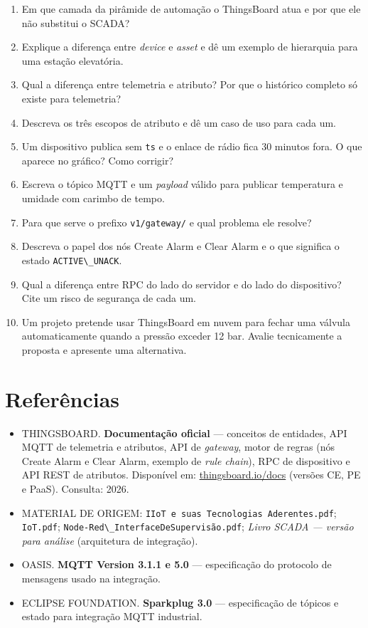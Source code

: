 \begin{enumerate}
\def\labelenumi{\arabic{enumi}.}
\tightlist
\item
  Em que camada da pirâmide de automação o ThingsBoard atua e por que ele não substitui o SCADA?
\item
  Explique a diferença entre \emph{device} e \emph{asset} e dê um exemplo de hierarquia para uma estação elevatória.
\item
  Qual a diferença entre telemetria e atributo? Por que o histórico completo só existe para telemetria?
\item
  Descreva os três escopos de atributo e dê um caso de uso para cada um.
\item
  Um dispositivo publica sem \passthrough{\lstinline!ts!} e o enlace de rádio fica 30 minutos fora. O que aparece no gráfico? Como corrigir?
\item
  Escreva o tópico MQTT e um \emph{payload} válido para publicar temperatura e umidade com carimbo de tempo.
\item
  Para que serve o prefixo \passthrough{\lstinline!v1/gateway/!} e qual problema ele resolve?
\item
  Descreva o papel dos nós Create Alarm e Clear Alarm e o que significa o estado \passthrough{\lstinline!ACTIVE\_UNACK!}.
\item
  Qual a diferença entre RPC do lado do servidor e do lado do dispositivo? Cite um risco de segurança de cada um.
\item
  Um projeto pretende usar ThingsBoard em nuvem para fechar uma válvula automaticamente quando a pressão exceder 12 bar. Avalie tecnicamente a proposta e apresente uma alternativa.
\end{enumerate}

\section{Referências}\label{referuxeancias}

\begin{itemize}
\tightlist
\item
  THINGSBOARD. \textbf{Documentação oficial} --- conceitos de entidades, API MQTT de telemetria e atributos, API de \emph{gateway}, motor de regras (nós Create Alarm e Clear Alarm, exemplo de \emph{rule chain}), RPC de dispositivo e API REST de atributos. Disponível em: \url{thingsboard.io/docs} (versões CE, PE e PaaS). Consulta: 2026.
\item
  MATERIAL DE ORIGEM: \passthrough{\lstinline!IIoT e suas Tecnologias Aderentes.pdf!}; \passthrough{\lstinline!IoT.pdf!}; \passthrough{\lstinline!Node-Red\_InterfaceDeSupervisão.pdf!}; \emph{Livro SCADA --- versão para análise} (arquitetura de integração).
\item
  OASIS. \textbf{MQTT Version 3.1.1 e 5.0} --- especificação do protocolo de mensagens usado na integração.
\item
  ECLIPSE FOUNDATION. \textbf{Sparkplug 3.0} --- especificação de tópicos e estado para integração MQTT industrial.
\end{itemize}
